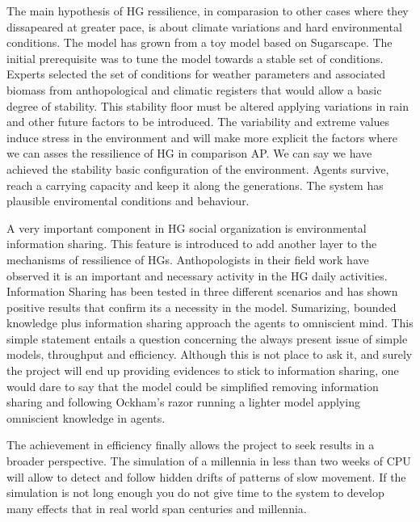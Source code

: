 \documentclass[11pt,oneside,a4paper,openright]{report}
\begin{document}
The main hypothesis of HG ressilience, in comparasion to other cases where they dissapeared at 
greater pace, is about climate variations and hard environmental conditions.
The model has grown from a toy model based on Sugarscape\cite{EpsteinAxtell}. The initial prerequisite
was to tune the model towards a stable set of conditions. Experts selected the set of conditions 
for weather parameters and associated biomass from anthopological and climatic registers that would 
allow a basic degree of stability. This stability floor must be altered applying variations in rain and
other future factors to be introduced. The variability and extreme values induce stress in the 
environment and will make more explicit the factors where we can asses the ressilience of HG in comparison AP. We 
can say we have achieved the stability basic configuration of the environment. Agents survive, reach a carrying capacity and keep it along the generations. The system has plausible enviromental conditions and behaviour.

A very important component in HG social organization is environmental information sharing. This feature
is introduced to add another layer to the mechanisms of ressilience of HGs. Anthopologists in their
field work have observed it is an important and necessary activity in the HG daily activities. 
Information Sharing has been tested in three different scenarios and has shown positive results that
confirm its a necessity in the model. Sumarizing, bounded knowledge plus information sharing approach 
the agents to omniscient mind. This simple statement entails a question concerning the always present issue 
of simple models, throughput and efficiency. Although this is not place to ask it, and surely the project will end up providing evidences to stick to information sharing, one would dare to say that the model could be simplified
removing information sharing and following Ockham's razor running a lighter model applying omniscient
knowledge in agents.

The achievement in efficiency finally allows the project to seek results in a broader perspective. The 
simulation of a millennia in less than two weeks of CPU will allow to detect and follow hidden drifts of patterns
of slow movement. If the simulation is not long enough you do not give time to the system to develop many
effects that in real world span centuries and millennia.
\end{document}
